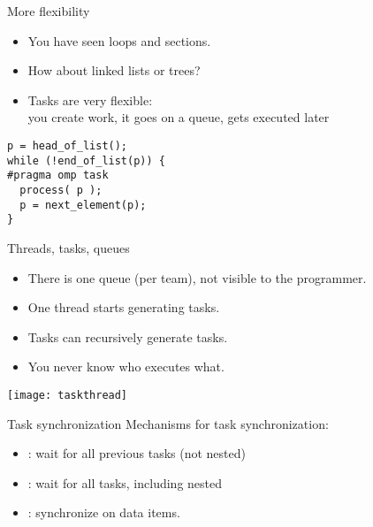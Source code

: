 
\begin{frame}[containsverbatim]{More flexibility}
  \begin{itemize}
  \item You have seen loops and sections.
  \item How about linked lists or trees?
  \item Tasks are very flexible:\\
    you create work, it goes on a queue, gets executed later
  \end{itemize}
\begin{verbatim}
p = head_of_list();
while (!end_of_list(p)) {
#pragma omp task
  process( p );
  p = next_element(p);
}
\end{verbatim}
\end{frame}

\begin{frame}{Threads, tasks, queues}
  \begin{itemize}
  \item There is one queue (per team), not visible to the programmer.
  \item One thread starts generating tasks.
  \item Tasks can recursively generate tasks.
  \item You never know who executes what.
  \end{itemize}
  \texttt{[image: taskthread]}
\end{frame}

\begin{exerciseframe}[taskfactor]
  
\end{exerciseframe}

\begin{frame}[containsverbatim]{Task synchronization}
  Mechanisms for task synchronization:
  \begin{itemize}
  \item {}: wait for all previous tasks (not nested)
  \item {}: wait for all tasks, including nested
  \item {}: synchronize on data items.
  \end{itemize}
\end{frame}


